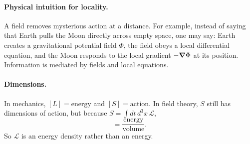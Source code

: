 \documentclass[../main.tex]{subfiles}
\begin{document}
\paragraph{Physical intuition for locality.}
A field removes mysterious action at a distance.  For example, instead of saying
that Earth pulls the Moon directly across empty space, one may say: Earth
creates a gravitational potential field $\Phi$, the field obeys a local
differential equation, and the Moon responds to the local gradient
$-\grad\Phi$ at its position.  Information is mediated by fields and local
equations.

\paragraph{Dimensions.}
In mechanics, $[L]=\text{energy}$ and $[S]=\text{action}$.  In field theory,
$S$ still has dimensions of action, but because $S=\int dt\,d^3x\,\mathcal L$,
\begin{equation}
  [\mathcal L]=\frac{\text{energy}}{\text{volume}}.
\end{equation}
So $\mathcal L$ is an energy density rather than an energy.
\end{document}
